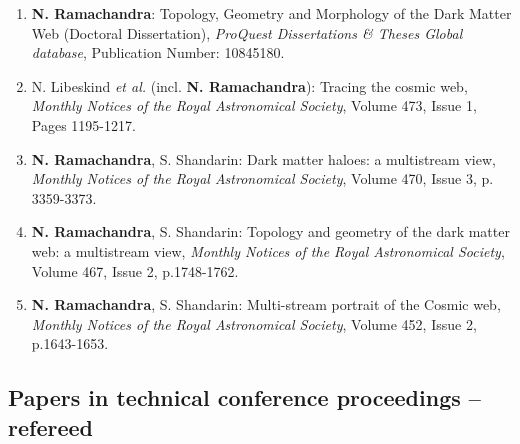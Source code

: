 \documentclass[letterpaper]{article}
\begin{document}
\begin{enumerate}
\item \textbf{N. Ramachandra}: Topology, Geometry and Morphology of the Dark Matter Web (Doctoral Dissertation), {\it ProQuest Dissertations \& Theses Global database}, Publication Number: 10845180. 

\item N. Libeskind {\it et al.} (incl. \textbf{N. Ramachandra}): Tracing the cosmic web, {\it Monthly Notices of the Royal Astronomical Society}, Volume 473, Issue 1, Pages 1195-1217.



\item \textbf{N. Ramachandra}, S. Shandarin: Dark matter haloes: a multistream view, {\it Monthly Notices of the Royal Astronomical Society}, Volume 470, Issue 3, p. 3359-3373.

\item \textbf{N. Ramachandra}, S. Shandarin: Topology and geometry of the dark matter web: a multistream view, {\it Monthly Notices of the Royal Astronomical Society}, Volume 467, Issue 2, p.1748-1762.

\item \textbf{N. Ramachandra}, S. Shandarin: Multi-stream portrait of the Cosmic web, {\it Monthly Notices of the Royal Astronomical Society}, Volume 452, Issue 2, p.1643-1653. 

\end{enumerate}



\subsection*{Papers in technical conference proceedings – refereed}
\end{document}
